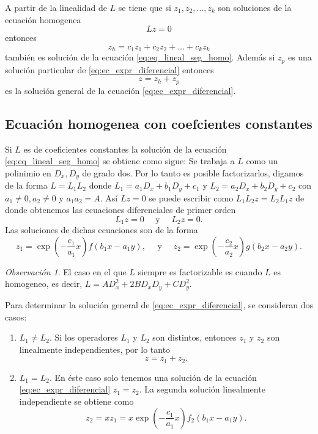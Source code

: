 \documentclass[11pt,letterpaper,draft]{report}
\theoremstyle{plain}
\theoremstyle{definition}
\theoremstyle{remark}
\newtheorem{remark}[theorem]{Observación}
\newcommand\<{\langle}
\renewcommand\>{\rangle}
\begin{document}
A partir de la linealidad de $L$ se tiene que si
$z_1,z_2,\ldots,z_k$ son soluciones de la ecuación homogenea
\begin{equation}
  \label{eq:eq_lineal_seg_homo}
  Lz = 0
\end{equation}
entonces 
\[
z_h = c_1 z_1 + c_2 z_2 + \ldots + c_k z_k
\] 
también es solución de la ecuación \ref{eq:eq_lineal_seg_homo}.
Además si $z_p$ es una solución particular de
\ref{eq:ec_expr_diferencial} entonces
\[
z = z_h + z_p
\] 
es la solución general de la ecuación
\ref{eq:ec_expr_diferencial}.

\subsection{Ecuación homogenea con coefcientes constantes}

Si $L$ es de coeficientes constantes la solución de la
ecuación \ref{eq:eq_lineal_seg_homo} se obtiene como sigue:
Se trabaja a $L$ como un polinimio en $D_x, D_y$ de grado
dos. Por lo tanto es posible factorizarlos, digamos de la
forma $L = L_1 L_2$ donde $L_1 = a_1 D_x + b_1 D_y + c_1$ y
$L_2 = a_2 D_x + b_2 D_y + c_2$ con $a_1 \neq 0, a_2 \neq
0$ y $a_1 a_2 = A$. Así $L z = 0$ se puede escribir como
$L_1 L_2 z = L_2 L_1 z$ de donde obtenemos las ecuaciones
diferenciales de primer orden
\[
L_1 z = 0 \quad \text{ y } \quad L_2 z = 0.
\] 
Las soluciones de dichas ecuaciones son de la forma
\[
z_1 = \exp\left(-\frac{c_1}{a_1} x\right) f(b_1x-a_1y),
\quad \text{ y } \quad z_2 = \exp\left(-\frac{c_2}{a_2}
  x\right) g(b_2x - a_2y).
\] 
\begin{remark}
  El caso en el que $L$ siempre es factorizable es cuando $L$
  es homogeneo, es decir, $L = AD_x^2 + 2BD_xD_y + CD_y^2$. 
\end{remark}
Para determinar la solución general de
\ref{eq:ec_expr_diferencial}, se consideran dos casos:
\begin{enumerate}
  \item $L_1 \neq L_2$. Si los operadores $L_1$ y $L_2$ son
    distintos, entonces $z_1$ y $z_2$ son linealmente
    independientes, por lo tanto
    \[
    z = z_1 + z_2.
    \] 
  \item $L_1 = L_2$. En éste caso solo tenemos una solución
    de la ecuación \ref{eq:ec_expr_diferencial} $z_1 = z_2$.
    La segunda solución linealmente independiente se obtiene
    como
    \[
    z_2 = x z_1 = x \exp\left(-\frac{c_1}{a_1} x\right)
    f_2(b_1x - a_1y).
    \] 
\end{enumerate}
\end{document}

